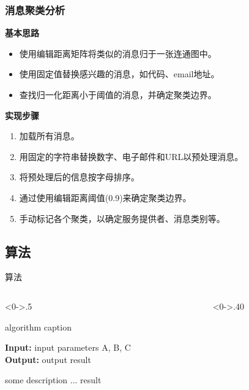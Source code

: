 \documentclass[10pt,aspectratio=43,mathserif]{beamer}
\begin{document}
\begin{frame}
\frametitle{消息聚类分析}
\begin{block}{\textbf{基本思路}}
	\begin{itemize}
		\item 使用编辑距离矩阵将类似的消息归于一张连通图中。
		\item 使用固定值替换感兴趣的消息，如代码、email地址。
		\item 查找归一化距离小于阈值的消息，并确定聚类边界。
	\end{itemize}
\end{block}

\begin{block}{\textbf{实现步骤}}
	\begin{enumerate}
		\item 加载所有消息。
		\item 用固定的字符串替换数字、电子邮件和URL以预处理消息。
		\item 将预处理后的信息按字母排序。
		\item 通过使用编辑距离阈值(0.9)来确定聚类边界。
		\item 手动标记各个聚类，以确定服务提供者、消息类别等。
	\end{enumerate}
\end{block}
\end{frame}

\subsection{算法}
\begin{frame}{算法}
\begin{columns}[T] %
   	\begin{column}<0->{.5\textwidth}
   	\begin{algorithm}[H]  
   		\caption{algorithm caption} %
   		\hspace*{0.02in} {\bf Input:} %
   		input parameters A, B, C\\
   		\hspace*{0.02in} {\bf Output:} %
   		output result 
   		\begin{algorithmic}[1] %
   		\State some description %
   		\State ...
   		\Else
   		\EndIf
   		\EndFor
   		\EndWhile
   		\State \Return result	
   		\end{algorithmic}  
   	\end{algorithm}
   	\end{column}%
   \hfill%
    \begin{column}<0->{.40\textwidth}
 
   	\end{column}%
   \end{columns}
\end{frame}
\end{document}

